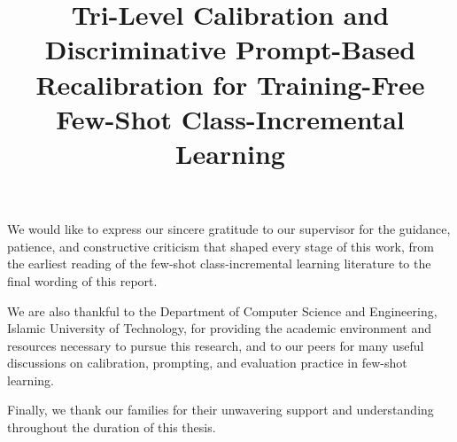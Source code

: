 \documentclass{iutbscthesis}
\title{Tri-Level Calibration and Discriminative Prompt-Based Recalibration for Training-Free Few-Shot Class-Incremental Learning}
\begin{document}

\coverpage


\titlepage

\declarationofcandidate


\tableofcontents
\listoffigures
\listoftables

\clearpage

\begin{abbreviations}
\end{abbreviations}

\begin{acknowledgement}

We would like to express our sincere gratitude to our supervisor for the guidance, patience, and constructive criticism that shaped every stage of this work, from the earliest reading of the few-shot class-incremental learning literature to the final wording of this report.

We are also thankful to the Department of Computer Science and Engineering, Islamic University of Technology, for providing the academic environment and resources necessary to pursue this research, and to our peers for many useful discussions on calibration, prompting, and evaluation practice in few-shot learning.

Finally, we thank our families for their unwavering support and understanding throughout the duration of this thesis.

\end{acknowledgement}
\end{document}
